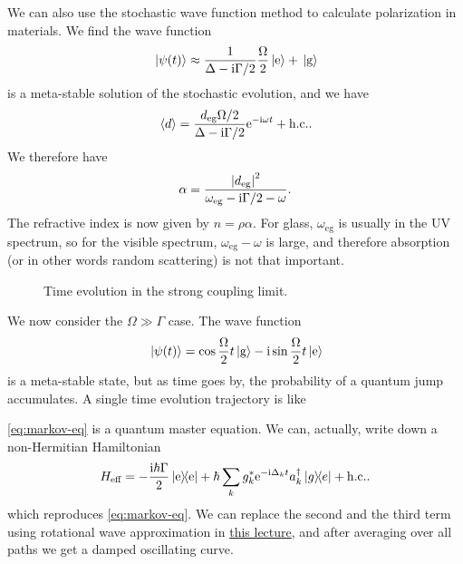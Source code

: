 \documentclass[hyperref, a4paper]{article}
\newcommand*{\ii}{\mathrm{i}}
\newcommand*{\ee}{\mathrm{e}}
\begin{document}
We can also use the stochastic wave function method to calculate polarization in materials.
We find the wave function
\begin{equation}
    \ket*{\psi(t)} \approx \frac{1}{\Delta - \ii \Gamma / 2} \frac{\Omega}{2} \ket*{\text{e}} + \ket*{\text{g}}
\end{equation}
is a meta-stable solution of the stochastic evolution, and we have 
\begin{equation}
    \expval*{d} = \frac{d_\text{eg} \Omega / 2}{\Delta - \ii \Gamma / 2} \ee^{- \ii \omega t} + \text{h.c.}.
\end{equation}
We therefore have 
\begin{equation}
    \alpha = \frac{\abs{d_\text{eg}}^2}{\omega_\text{eg} - \ii \Gamma / 2 - \omega}.
    \label{eq:polarization}
\end{equation}
The refractive index is now given by $n = \rho \alpha$. For glass, $\omega_\text{eg}$ is usually in the UV 
spectrum, so for the visible spectrum, $\omega_\text{eg} - \omega$ is large, and therefore absorption 
(or in other words random scattering) is not that important.

\begin{figure}
    \centering
    
    \caption{Time evolution in the strong coupling limit.}
\end{figure}

We now consider the $\Omega \gg \Gamma$ case. The wave function 
\begin{equation}
    \ket*{\psi(t)} = \cos \frac{\Omega}{2} t \ket*{\text{g}} - \ii \sin \frac{\Omega}{2} t \ket*{\text{e}}
\end{equation}
is a meta-stable state, but as time goes by, the probability of a quantum jump accumulates. 
A single time evolution trajectory is like 

\eqref{eq:markov-eq} is a quantum master equation. We can, actually, write down a non-Hermitian Hamiltonian
\begin{equation}
    H_\text{eff} = - \frac{\ii \hbar \Gamma}{2} \dyad{\text{e}} 
    + \hbar \sum_{k} g_k^* \ee^{- \ii \Delta_k t} a_k^\dagger \dyad{g}{e} + \text{h.c.}.
\end{equation}
which reproduces \eqref{eq:markov-eq}. We can replace the second and the third term using rotational 
wave approximation in \href{10-28.pdf}{this lecture}, and after averaging over all paths we get a 
damped oscillating curve.
\end{document}
